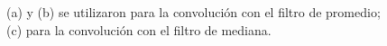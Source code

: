 \documentclass[conference]{IEEEtran}
\begin{document}
\begin{figure}[htbp]
	\centering
	\caption{(a) y (b) se utilizaron para la convoluci\'on con el filtro de promedio; (c) para la convoluci\'on con el filtro de mediana. }
\end{figure}
\end{document}
